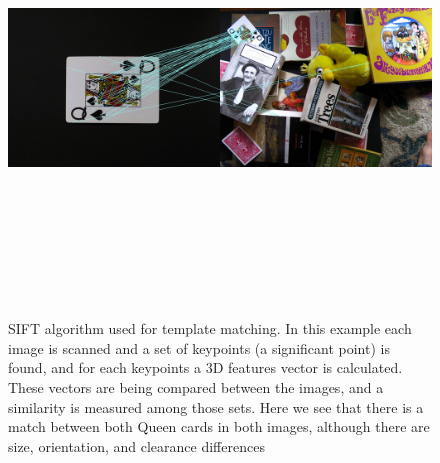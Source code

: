 \begin{figure} \label{s1}
	    \centering
		\includegraphics[width=\linewidth,height=12cm,keepaspectratio]{Figures/sift1}
		\caption[SIFT algorithm used for template matching]
		{SIFT algorithm used for template matching. In this example each image is scanned and a set of keypoints (a significant point) is found, and for each keypoints a 3D features vector is calculated. These vectors are being compared between the images, and a similarity is measured among those sets. Here we see that there is a match between both Queen cards in both images, although there are size, orientation, and clearance differences}
\end{figure}
	
